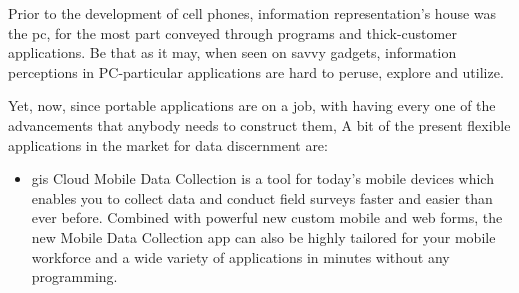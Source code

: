 Prior to the development of cell phones, information representation's house was the \gls{pc}, for the most part conveyed through programs and thick-customer applications. Be that as it may, when seen on savvy gadgets, information perceptions in PC-particular applications are hard to peruse, explore and utilize.

Yet, now, since portable applications are on a job, with having every one of the advancements that anybody needs to construct them, A bit of the present flexible applications in the market for data discernment are:

\begin{itemize}
  \item \gls{gis} Cloud Mobile Data Collection is a tool for today’s mobile devices which enables you to collect data and conduct field surveys faster and easier than ever before. Combined with powerful new custom mobile and web forms, the new Mobile Data Collection app can also be highly tailored for your mobile workforce and a wide variety of applications in minutes without any programming.
  
  
  

\end{itemize}
